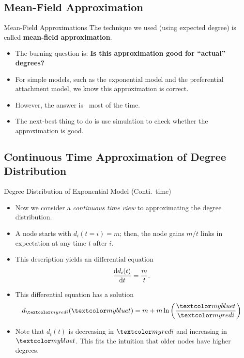 \documentclass{beamer}
\begin{document}
\subsection{Mean-Field Approximation} %

\begin{frame}{Mean-Field Approximations}
	The technique we used (using expected degree) is called \textbf{mean-field approximation}.
	\begin{itemize}
		\item
			The burning question is: \textbf{Is this approximation good for ``actual'' degrees?}
		\item
			For simple models, such as the exponential model and the preferential attachment model, we know this approximation is correct.
		\item
			However, the answer is \shruggie\ most of the time.
		\item
			The next-best thing to do is use simulation to check whether the approximation is good.
	\end{itemize}
\end{frame}


\subsection{Continuous Time Approximation of Degree Distribution}

\begin{frame}{Degree Distribution of Exponential Model (Conti.\ time)}
	\begin{itemize}
		\item
			Now we consider a \emph{continuous time view} to approximating the degree distribution.
		\item
			A node starts with $d_{i}(t=i)=m$;
			then, the node gains $m/t$ links in expectation at any time $t$ after $i$.
		\item
			This description yields an differential equation
			\begin{align*}
				\D{t}{d_{i}(t)} = \frac{m}{t}.
			\end{align*}
		\item
			This differential equation has a solution
			\begin{align*}
				d_{\red{i}}(\blue{t}) = m+m\ln\left(\frac{\blue{t}}{\red{i}}\right)
			\end{align*}
		\item
			Note that $d_{i}(t)$ is decreasing in $\red{i}$ and increasing in $\blue{t}$.
			This fits the intuition that older nodes have higher degrees.
	\end{itemize}
\end{frame}
\end{document}

